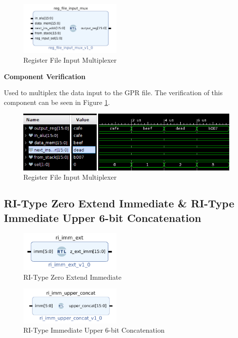 \documentclass{article}
\newcommand{\stitle}{Component Verification}
\begin{document}
\begin{par}
	\begin{figure}[H]
		\centering
		\includegraphics[width=2in]{img/regFileMux.png}
		\caption{Register File Input Multiplexer}
	\end{figure}
	
	\textbf{\stitle}
	\begin{par}
		Used to multiplex the data input to the GPR file. The verification of this component can be seen in Figure \ref{fig:gprMuxTB}.
	\end{par}
	
	\begin{figure}[H]
		\centering
		\includegraphics[width=5in]{img/regFileMuxTB.png}
		\caption{Register File Input Multiplexer}
		\label{fig:gprMuxTB}
	\end{figure}
	
	\newpage

	\subsection{RI-Type Zero Extend Immediate \& RI-Type Immediate Upper 6-bit Concatenation}
	
	\begin{figure}[H]
		\centering
		\includegraphics[width=2in]{img/riImmExt.png}
		\caption{RI-Type Zero Extend Immediate}
	\end{figure}

	\begin{figure}[H]
		\centering
		\includegraphics[width=2in]{img/upcon.png}
		\caption{RI-Type Immediate Upper 6-bit Concatenation}
	\end{figure}
	

\end{par}
\end{document}
